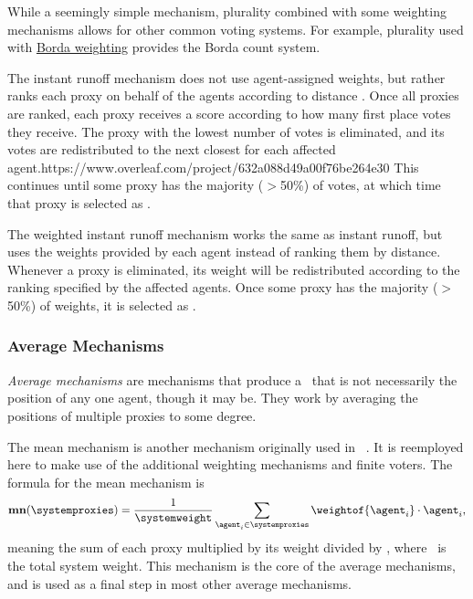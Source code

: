While a seemingly simple mechanism, plurality combined with some
weighting mechanisms allows for other common voting systems.
For example, plurality used with \hyperref[para:borda]{Borda weighting}
provides the Borda count system.  

\label{para:cand-instant-runoff}
The instant runoff mechanism does not use agent-assigned weights, but rather
ranks each proxy on behalf of the agents according to distance .
Once all proxies are ranked, each proxy receives a score according to how
many first place votes they receive.
The proxy with the lowest number of votes is eliminated, and its votes are
redistributed to the next closest for each affected agent.https://www.overleaf.com/project/632a088d49a00f76be264e30
This continues until some proxy has the majority ($>$50\%) of votes, at which
time that proxy is selected as \systemtruth.  

\label{para:cand-weighted-instant-runoff}
\label{para:candidate-weighted-instant-runoff}
The weighted instant runoff mechanism works the same as instant runoff, but uses
the weights provided by each agent instead of ranking them by distance.
Whenever a proxy is eliminated, its weight will be redistributed according to
the ranking specified by the affected agents.
Once some proxy has the majority ($>$50\%) of weights, it is selected as
\systemtruth.

\subsubsection{Average Mechanisms}\label{subsubsec:average-mechanisms}
\textit{Average mechanisms} are mechanisms that produce a \systemtruth\ that
is not necessarily the position of any one agent, though it may be.
They work by averaging the positions of multiple proxies to some degree.

\label{para:mean}
The mean mechanism is another mechanism originally used in
~\cite{Cohensius2017}.
It is reemployed here to make use of the additional weighting mechanisms and
finite voters.
The formula for the mean mechanism is
\begin{equation*}
    \mathbf{mn}(\systemproxies) =
    \frac{1}{\systemweight}
    \sum_{\agent_i \in \systemproxies} {\weightof{\agent_i} \cdot \agent_i}
    \text{,}\label{eq:mean-mechanism}
\end{equation*}
meaning the sum of each proxy multiplied by its weight divided by
\systemweight, where \systemweight\ is the total system weight.
This mechanism is the core of the average mechanisms, and is used as a final
step in most other average mechanisms.

